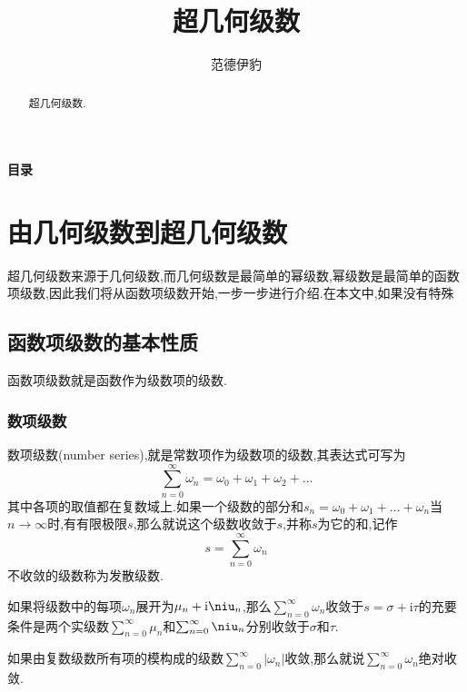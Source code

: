 \documentclass[zihao=-4,a4paper]{ctexart}
\title{超几何级数}
\author[$\dagger$]{\kaishu 范德伊豹}
\affil[$\dagger$]{\kaishu 上海理工大学物理系}
\begin{document}
\maketitle
\begin{abstract}
	超几何级数.
\end{abstract}
{\centering \Large\bfseries 目录 \par}
\tableofcontents


\section{由几何级数到超几何级数}

超几何级数来源于几何级数,而几何级数是最简单的幂级数,幂级数是最简单的函数项级数,因此我们将从函数项级数开始,一步一步进行介绍.在本文中,如果没有特殊

\subsection{函数项级数的基本性质}

函数项级数就是函数作为级数项的级数.

\subsubsection{数项级数}

数项级数(number series),就是常数项作为级数项的级数,其表达式可写为
\begin{equation}
	\sum^{\infty}_{n=0} {\omega}_{n} = {\omega}_{0} + {\omega}_{1} + {\omega}_{2} + ...
\end{equation}
其中各项的取值都在复数域上.如果一个级数的部分和${s}_{n} = {\omega}_{0} + {\omega}_{1} + ... + {\omega}_{n}$当$n {\to} {\infty}$时,有有限极限$s$,那么就说这个级数收敛于$s$,并称$s$为它的和,记作
\begin{equation}
	s = \sum^{\infty}_{n=0} {\omega}_{n}
\end{equation}
不收敛的级数称为发散级数.

如果将级数中的每项${\omega}_{n}$展开为${\mu}_{n} + {\text{i}} {\niu}_{n}$,那么$\sum^{\infty}_{n=0} {\omega}_{n}$收敛于$s = {\sigma} + {\text{i}}{\tau}$的充要条件是两个实级数$\sum^{\infty}_{n=0} {\mu}_{n}$和$\sum^{\infty}_{n=0} {\niu}_{n}$分别收敛于${\sigma}$和${\tau}$.

如果由复数级数所有项的模构成的级数$\sum^{\infty}_{n=0} | {\omega}_{n} |$收敛,那么就说$\sum^{\infty}_{n=0} {\omega}_{n}$绝对收敛.
\end{document}
